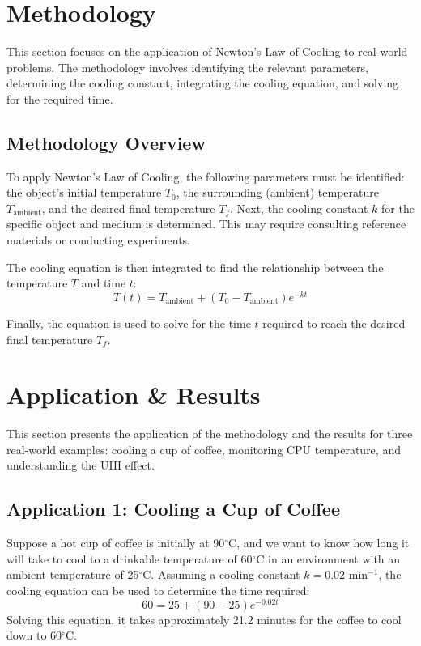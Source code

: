 \documentclass[12pt, a4paper]{article}
\begin{document}
\section{Methodology}
This section focuses on the application of Newton's Law of Cooling to real-world problems. The methodology involves identifying the relevant parameters, determining the cooling constant, integrating the cooling equation, and solving for the required time.

\subsection{Methodology Overview}
To apply Newton's Law of Cooling, the following parameters must be identified: the object's initial temperature $T_0$, the surrounding (ambient) temperature $T_{\text{ambient}}$, and the desired final temperature $T_f$. Next, the cooling constant $k$ for the specific object and medium is determined. This may require consulting reference materials or conducting experiments.

The cooling equation is then integrated to find the relationship between the temperature $T$ and time $t$:
\begin{equation}
    T(t) = T_{\text{ambient}} + (T_0 - T_{\text{ambient}}) e^{-kt}
\end{equation}

Finally, the equation is used to solve for the time $t$ required to reach the desired final temperature $T_f$.

\section{Application \& Results}
This section presents the application of the methodology and the results for three real-world examples: cooling a cup of coffee, monitoring CPU temperature, and understanding the UHI effect.

\subsection{Application 1: Cooling a Cup of Coffee}
Suppose a hot cup of coffee is initially at 90$^\circ$C, and we want to know how long it will take to cool to a drinkable temperature of 60$^\circ$C in an environment with an ambient temperature of 25$^\circ$C. Assuming a cooling constant $k = 0.02$ min$^{-1}$, the cooling equation can be used to determine the time required:
\begin{equation}
    60 = 25 + (90 - 25) e^{-0.02t}
\end{equation}
Solving this equation, it takes approximately 21.2 minutes for the coffee to cool down to 60$^\circ$C.
\end{document}
